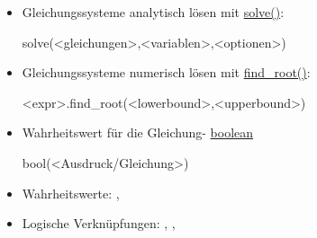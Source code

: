 \documentclass[a4paper,9pt,DIV15,twocolumn]{scrartcl}
\begin{document}
\begin{itemize}
 \item Gleichungssysteme analytisch lösen mit \href{https://sage.math.uni-goettingen.de/doc/static/reference/sage/symbolic/relation.html?highlight=symbolic.relation#sage.symbolic.relation.solve}{solve()}:
\begin{sagein}
 solve(<gleichungen>,<variablen>,<optionen>)
\end{sagein}
\item Gleichungssysteme numerisch lösen mit \href{https://sage.math.uni-goettingen.de/doc/static/reference/sage/numerical/optimize.html?highlight=numerical.optimize#sage.numerical.optimize.find_root}{find\_root()}:
    \begin{sagein}
<expr>.find_root(<lowerbound>,<upperbound>)
    \end{sagein}

 \item Wahrheitswert für die Gleichung- \href{http://docs.python.org/library/stdtypes.html#boolean-operations-and-or-not}{boolean}
     \begin{sagein}
bool(<Ausdruck/Gleichung>)   
     \end{sagein}
 \item Wahrheitswerte: , 
 \item Logische Verknüpfungen: , , 
\end{itemize}
\end{document}
